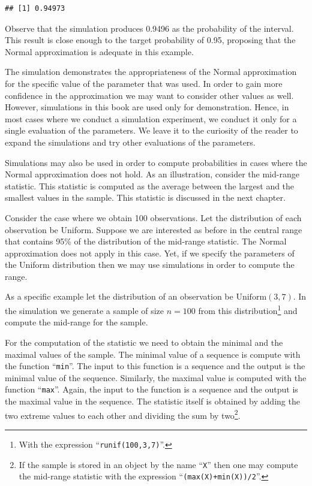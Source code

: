 \documentclass[]{krantz}
\theoremstyle{definition}
\theoremstyle{definition}
\theoremstyle{definition}
\theoremstyle{remark}
\begin{document}
\begin{verbatim}
## [1] 0.94973
\end{verbatim}

Observe that the simulation produces 0.9496 as the probability of the
interval. This result is close enough to the target probability of 0.95,
proposing that the Normal approximation is adequate in this example.

The simulation demonstrates the appropriateness of the Normal
approximation for the specific value of the parameter that was used. In
order to gain more confidence in the approximation we may want to
consider other values as well. However, simulations in this book are
used only for demonstration. Hence, in most cases where we conduct a
simulation experiment, we conduct it only for a single evaluation of the
parameters. We leave it to the curiosity of the reader to expand the
simulations and try other evaluations of the parameters.

Simulations may also be used in order to compute probabilities in cases
where the Normal approximation does not hold. As an illustration,
consider the mid-range statistic. This statistic is computed as the
average between the largest and the smallest values in the sample. This
statistic is discussed in the next chapter.

Consider the case where we obtain 100 observations. Let the distribution
of each observation be Uniform. Suppose we are interested as before in
the central range that contains 95\% of the distribution of the
mid-range statistic. The Normal approximation does not apply in this
case. Yet, if we specify the parameters of the Uniform distribution then
we may use simulations in order to compute the range.

As a specific example let the distribution of an observation be
\(\mathrm{Uniform}(3,7)\). In the simulation we generate a sample of
size \(n=100\) from this distribution\footnote{With the expression
  ``\texttt{runif(100,3,7)}''.} and compute the mid-range for the
sample.

For the computation of the statistic we need to obtain the minimal and
the maximal values of the sample. The minimal value of a sequence is
compute with the function ``\texttt{min}''. The input to this function
is a sequence and the output is the minimal value of the sequence.
Similarly, the maximal value is computed with the function
``\texttt{max}''. Again, the input to the function is a sequence and the
output is the maximal value in the sequence. The statistic itself is
obtained by adding the two extreme values to each other and dividing the
sum by two\footnote{If the sample is stored in an object by the name
  ``\texttt{X}'' then one may compute the mid-range statistic with the
  expression ``\texttt{(max(X)+min(X))/2}''.}.
\end{document}
